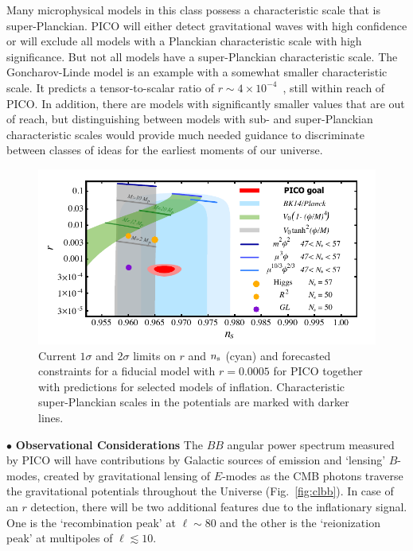 \documentclass[PICOReport.tex]{subfiles}
\begin{document}
Many microphysical models in this class possess a characteristic scale that is super-Planckian. PICO will either detect gravitational waves with high confidence or will exclude all models with a Planckian characteristic scale with high significance. But not all models have a super-Planckian characteristic scale. The Goncharov-Linde model is an example with a somewhat smaller characteristic scale. It predicts a tensor-to-scalar ratio of $r\sim 4\times 10^{-4}$~\cite{Goncharov:1983mw}, still within reach of PICO. In addition, there are models with significantly smaller values that are out of reach, but distinguishing between models with sub- and super-Planckian characteristic scales would provide much needed guidance to discriminate between classes of ideas for the earliest moments of our universe.


\begin{figure}[!thb]
\parbox{4.5in}{\centerline{
\includegraphics[width=4.5in]{images/nsrlabeledrp0005_PICOv4p1.pdf}}}
\parbox{1.8in}{
\caption{\captiontext  Current $1\sigma$ and 2$\sigma$ limits on $r$ and $n_{\rm s}$ (cyan) and forecasted constraints for a fiducial model with $r = 0.0005$ for PICO together with predictions for selected models of inflation. Characteristic super-Planckian scales in the potentials are marked with darker lines. }
\label{fig:nsr}}
\end{figure}

\noindent$\bullet$ {\bf Observational Considerations} \hspace{0.1in} The $BB$ angular power spectrum measured by PICO will have contributions by Galactic sources of emission and `lensing' $B$-modes, created by gravitational lensing of $E$-modes as the CMB photons traverse the gravitational potentials throughout the Universe (Fig.~\ref{fig:clbb}). In case of an $r$ detection, there will be two additional features due to the inflationary signal. One is the `recombination peak' at $\ell \sim 80$ and the other is the `reionization peak' at multipoles of $\ell\lesssim 10$. 
\end{document}

